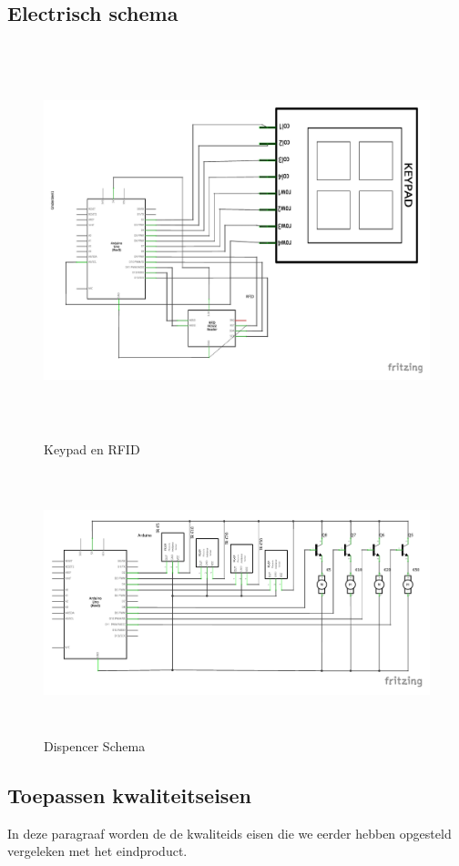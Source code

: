 \documentclass{article}
\begin{document}
\subsection{Electrisch schema}
\begin{figure}[H]
       \centering
       \includegraphics[height=4.5in]{Input_schema.pdf}
       \caption{Keypad en RFID}
       \label{fig: Keypad en RFID}
\end{figure}

\begin{figure}[H]
	\centering
	\includegraphics[height=3.0in]{Dispenser_schema.pdf}
	\caption{Dispencer Schema}
	\label{fig: Dispencer Schema}
\end{figure}

\subsection{Toepassen kwaliteitseisen}
In deze paragraaf worden de de kwaliteids eisen die we eerder hebben opgesteld vergeleken met het eindproduct.
\end{document}
